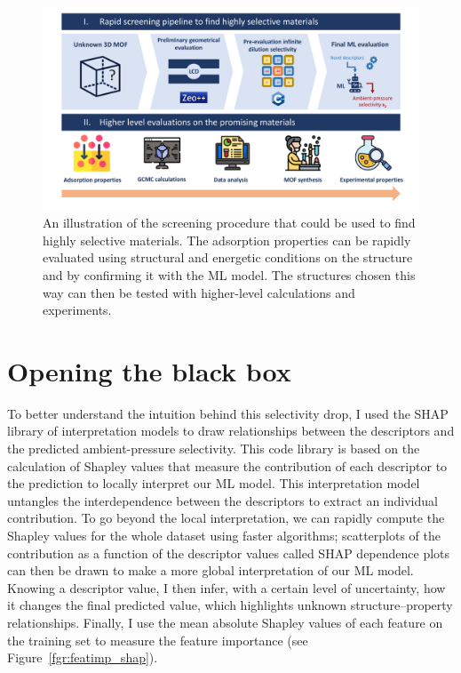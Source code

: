 \documentclass[main]{subfiles}
\begin{document}
\begin{figure}[ht]
\centering
  \includegraphics[width=0.99\linewidth]{figures/4-ml/main/pipeline.pdf}
  \caption{An illustration of the screening procedure that could be used to find highly selective materials. The adsorption properties can be rapidly evaluated using structural and energetic conditions on the structure and by confirming it with the ML model. The structures chosen this way can then be tested with higher-level calculations and experiments. }\label{fgr:pipeline}
\end{figure}

\section{Opening the black box}

To better understand the intuition behind this selectivity drop, I used the SHAP\autocite{SHAP,molnar2020interpretable} library of interpretation models to draw relationships between the descriptors and the predicted ambient-pressure selectivity. This code library is based on the calculation of Shapley values\autocite{shapley1953value} that measure the contribution of each descriptor to the prediction to locally interpret our ML model. This interpretation model untangles the interdependence between the descriptors to extract an individual contribution. To go beyond the local interpretation, we can rapidly compute the Shapley values for the whole dataset using faster algorithms;\autocite{SHAP} scatterplots of the contribution as a function of the descriptor values called SHAP dependence plots can then be drawn to make a more global interpretation of our ML model. Knowing a descriptor value, I then infer, with a certain level of uncertainty, how it changes the final predicted value, which highlights unknown structure--property relationships. Finally, I use the mean absolute Shapley values of each feature on the training set to measure the feature importance (see Figure~\ref{fgr:featimp_shap}).
\end{document}
